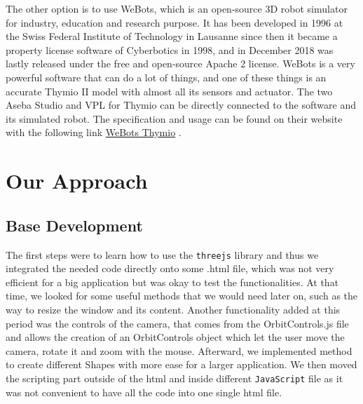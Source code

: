 \documentclass{scrbook}
\begin{document}
The other option is to use WeBots, which is an open-source 3D robot simulator for industry, education and research purpose. 
It has been developed in 1996 at the Swiss Federal Institute of Technology in Lausanne since then it became a property license software of Cyberbotics in 1998, 
and in December 2018 was lastly released under the free and open-source Apache 2 license.
WeBots is a very powerful software that can do a lot of things, and one of these things is an accurate Thymio II model with almost all its sensors and actuator. 
The two Aseba Studio and VPL for Thymio can be directly connected to the software and its simulated robot. 
The specification and usage can be found on their website with the following link \href{https://www.cyberbotics.com/doc/guide/thymio2#mosybas-thymio-ii}{WeBots Thymio} .

\chapter{Our Approach}

\section{Base Development}

The first steps were to learn how to use the \texttt{threejs} library and thus we integrated the needed code directly onto some .html file, which was not very efficient for a big application but was okay to test the functionalities. 
At that time, we looked for some useful methods that we would need later on, such as the way to resize the window and its content. Another functionality added at this period was the controls of the camera, that comes from the OrbitControls.js file and allows the creation of an OrbitControls object which let the user move the camera, rotate it and zoom with the mouse.
Afterward, we implemented method to create different Shapes with more ease for a larger application. We then moved the scripting part outside of the html and inside different \texttt{JavaScript} file as it was not convenient to have all the code into one single html file.


\end{document}
